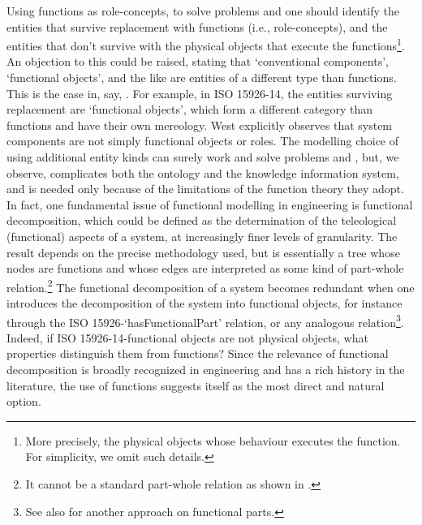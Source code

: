 \documentclass[
]{ceurart}
\begin{document}
Using functions as role-concepts, to solve problems  and  one should identify the entities that survive replacement with functions (i.e., role-concepts), and the entities that don't survive with the physical objects that execute the functions\footnote{More precisely, the physical objects whose behaviour executes the function. For simplicity, we omit such details.}. 
An objection to this could be raised, stating that `conventional components', `functional objects', and the like are entities of a different type than functions. This is the case in, say, \cite{westDevelopingHighQuality2011,guarinoArtefactualSystemsMissing2014,kluwerISO159261420202020}. For example, in ISO 15926-14, the entities surviving replacement are `functional objects', which form a different category than functions and have their own mereology. West \cite{westDevelopingHighQuality2011} explicitly observes that system components are not simply functional objects or roles. 
The modelling choice of using additional entity kinds can surely work and solve problems  and , but, we observe, complicates both the ontology and the knowledge information system, and is needed only because of the limitations of the function theory they adopt. 
In fact, one fundamental issue of functional modelling in engineering is functional decomposition, which could be defined as the determination of the teleological (functional) aspects of a system, at increasingly finer levels of granularity. The result depends on the precise methodology used, but is essentially a tree whose nodes are functions and whose edges are interpreted as some kind of part-whole relation.\footnote{It cannot be a standard part-whole relation as shown in \cite{vermaasFormalImpossibilityAnalysing2013}.}
The functional decomposition of a system becomes redundant when one introduces the decomposition of the system into functional objects, for instance through the ISO 15926-`hasFunctionalPart' relation, or any analogous relation\footnote{See also \cite{mizoguchiPreliminaryStudyFunctional2017} for another approach on functional parts.}. Indeed, if ISO 15926-14-functional objects are not physical objects, what properties distinguish them from functions?
Since the relevance of functional decomposition is broadly recognized in engineering and has a rich history in the literature, the use of functions suggests itself as the most direct and natural option.
\end{document}
